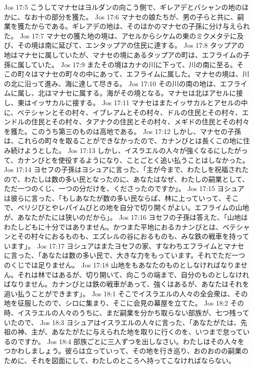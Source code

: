 Jos 17:5  こうしてマナセはヨルダンの向こう側で、ギレアデとバシャンの地のほかに、なお十の部分を獲た。
Jos 17:6  マナセの娘たちが、男の子らと共に、嗣業を獲たからである。ギレアデの地は、そのほかのマナセの子孫に分け与えられた。
Jos 17:7  マナセの獲た地の境は、アセルからシケムの東のミクメタテに及び、その境は南に延びて、エンタップアの住民に達する。
Jos 17:8  タップアの地はマナセに属していたが、マナセの境にあるタップアの町は、エフライムの子孫に属していた。
Jos 17:9  またその境はカナの川に下って、川の南に至る。そこの町々はマナセの町々の中にあって、エフライムに属した。マナセの境は、川の北に沿って進み、海に達して尽きる。
Jos 17:10  その川の南の地は、エフライムに属し、北はマナセに属する。海がその境となる。マナセは北はアセルに接し、東はイッサカルに接する。
Jos 17:11  マナセはまたイッサカルとアセルの中に、ベテシャンとその村々、イブレアムとその村々、ドルの住民とその村々、エンドルの住民とその村々、タアナクの住民とその村々、メギドの住民とその村々を獲た。このうち第三のものは高地である。
Jos 17:12  しかし、マナセの子孫は、これらの町々を取ることができなかったので、カナンびとは長くこの地に住み続けようとした。
Jos 17:13  しかし、イスラエルの人々が強くなるにしたがって、カナンびとを使役するようになり、ことごとく追い払うことはしなかった。
Jos 17:14  ヨセフの子孫はヨシュアに言った、「主が今まで、わたしを祝福されたので、わたしは数の多い民となったのに、あなたはなぜ、わたしの嗣業として、ただ一つのくじ、一つの分だけを、くださったのですか」。
Jos 17:15  ヨシュアは彼らに言った、「もしあなたが数の多い民ならば、林に上っていって、そこで、ペリジびとやレパイムびとの地を自分で切り開くがよい。エフライムの山地が、あなたがたには狭いのだから」。
Jos 17:16  ヨセフの子孫は答えた、「山地はわたしどもに十分ではありません。かつまた平地におるカナンびとは、ベテシャンとその村々におるものも、エズレルの谷におるものも、みな鉄の戦車を持っています」。
Jos 17:17  ヨシュアはまたヨセフの家、すなわちエフライムとマナセに言った、「あなたは数の多い民で、大きな力をもっています。それでただ一つのくじでは足りません。
Jos 17:18  山地をもあなたのものとしなければなりません。それは林ではあるが、切り開いて、向こうの端まで、自分のものとしなければなりません。カナンびとは鉄の戦車があって、強くはあるが、あなたはそれを追い払うことができます」。
Jos 18:1  そこでイスラエルの人々の全会衆は、その地を征服したので、シロに集まり、そこに会見の幕屋を立てた。
Jos 18:2  その時、イスラエルの人々のうちに、まだ嗣業を分かち取らない部族が、七つ残っていたので、
Jos 18:3  ヨシュアはイスラエルの人々に言った、「あなたがたは、先祖の神、主が、あなたがたに与えられた地を取りに行くのを、いつまで怠っているのですか。
Jos 18:4  部族ごとに三人ずつを出しなさい。わたしはその人々をつかわしましょう。彼らは立っていって、その地を行き巡り、おのおのの嗣業のために、それを図面にして、わたしのところへ持ってこなければならない。
